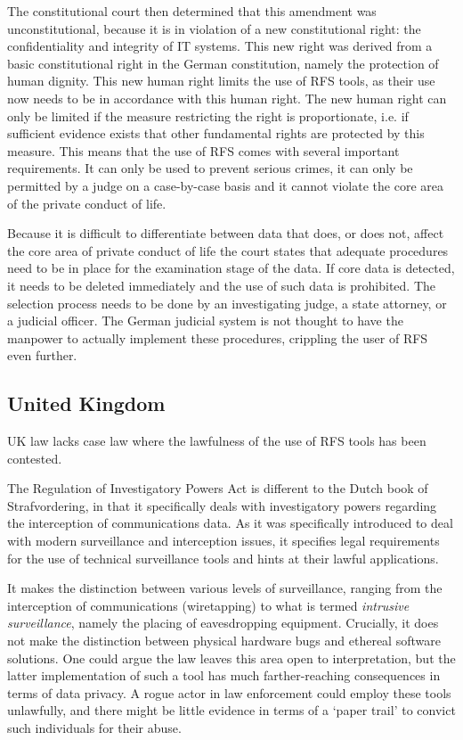 \documentclass[11pt]{article} %
\begin{document}
The constitutional court then determined that this amendment was unconstitutional, because it is in violation of a new constitutional right: the confidentiality and integrity of IT systems.
This new right was derived from a basic constitutional right in the German constitution, namely the protection of human dignity.
This new human right limits the use of RFS tools, as their use now needs to be in accordance with this human right.
The new human right can only be limited if the measure restricting the right is proportionate, i.e. if sufficient evidence exists that other fundamental rights are protected by this measure.
This means that the use of RFS comes with several important requirements.
It can only be used to prevent serious crimes, it can only be permitted by a judge on a case-by-case basis and it cannot violate the core area of the private conduct of life.

Because it is difficult to differentiate between data that does, or does not, affect the core area of private conduct of life the court states that adequate procedures need to be in place for the examination stage of the data.
If core data is detected, it needs to be deleted immediately and the use of such data is prohibited.
The selection process needs to be done by an investigating judge, a state attorney, or a judicial officer.
The German judicial system is not thought to have the manpower to actually implement these procedures, crippling the user of RFS even further.

\subsection{United Kingdom}
UK law lacks case law where the lawfulness of the use of RFS tools has been contested.

The Regulation of Investigatory Powers Act is different to the Dutch book of Strafvordering, in that it specifically deals with investigatory powers regarding the interception of communications data.
As it was specifically introduced to deal with modern surveillance and interception issues, it specifies legal requirements for the use of technical surveillance tools and hints at their lawful applications. \cite{regul_invest}

It makes the distinction between various levels of surveillance, ranging from the interception of communications (wiretapping) to what is termed \textit{intrusive surveillance}, namely the placing of eavesdropping equipment.
Crucially, it does not make the distinction between physical hardware bugs and ethereal software solutions.
One could argue the law leaves this area open to interpretation, but the latter implementation of such a tool has much farther-reaching consequences in terms of data privacy.
A rogue actor in law enforcement could employ these tools unlawfully, and there might be little evidence in terms of a `paper trail' to convict such individuals for their abuse.
\end{document}

